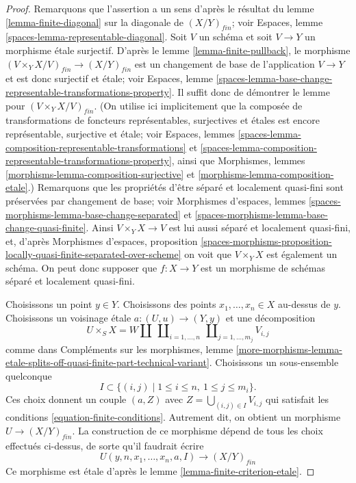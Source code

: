 \begin{proof}
Remarquons que l'assertion a un sens d'après le résultat du
lemme \ref{lemma-finite-diagonal}
sur la diagonale de $(X/Y)_{fin}$; voir
Espaces, lemme \ref{spaces-lemma-representable-diagonal}.
Soit $V$ un schéma et soit $V \to Y$ un morphisme étale surjectif. D'après le
lemme \ref{lemma-finite-pullback},
le morphisme $(V \times_Y X/V)_{fin} \to (X/Y)_{fin}$ est
un changement de base de l'application $V \to Y$ et est donc surjectif et étale; voir
Espaces,
lemme \ref{spaces-lemma-base-change-representable-transformations-property}.
Il suffit donc de démontrer le lemme pour $(V \times_Y X/V)_{fin}$.
(On utilise ici implicitement que la composée de transformations de foncteurs
représentables, surjectives et étales est encore représentable, surjective et
étale; voir
Espaces, lemmes \ref{spaces-lemma-composition-representable-transformations} et
\ref{spaces-lemma-composition-representable-transformations-property}, ainsi que
Morphismes, lemmes \ref{morphisms-lemma-composition-surjective} et
\ref{morphisms-lemma-composition-etale}.)
Remarquons que les propriétés d'être séparé et localement quasi-fini
sont préservées par changement de base; voir
Morphismes d'espaces,
lemmes \ref{spaces-morphisms-lemma-base-change-separated} et
\ref{spaces-morphisms-lemma-base-change-quasi-finite}.
Ainsi $V \times_Y X \to V$ est lui aussi séparé et localement quasi-fini,
et, d'après
Morphismes d'espaces, proposition
\ref{spaces-morphisms-proposition-locally-quasi-finite-separated-over-scheme}
on voit que $V \times_Y X$ est également un schéma.
On peut donc supposer que $f : X \to Y$ est un morphisme de schémas
séparé et localement quasi-fini.

\medskip\noindent
Choisissons un point $y \in Y$. Choisissons des points $x_1, \ldots, x_n \in X$
au-dessus de $y$. Choisissons un voisinage étale $a : (U, u) \to (Y, y)$ et une
décomposition
$$
U \times_S X =
W \amalg
\ \coprod\nolimits_{i = 1, \ldots, n}
\ \coprod\nolimits_{j = 1, \ldots, m_j}
V_{i, j}
$$
comme dans
Compléments sur les morphismes, lemme
\ref{more-morphisms-lemma-etale-splits-off-quasi-finite-part-technical-variant}.
Choisissons un sous-ensemble quelconque
$$
I \subset \{(i, j) \mid 1 \leq i \leq n, \ 1 \leq j \leq m_i\}.
$$
Ces choix donnent un couple $(a, Z)$ avec
$Z = \bigcup_{(i, j) \in I} V_{i, j}$
qui satisfait les conditions \ref{equation-finite-conditions}. Autrement dit,
on obtient un morphisme $U \to (X/Y)_{fin}$. La construction de ce morphisme
dépend de tous les choix effectués ci-dessus, de sorte qu'il faudrait écrire
$$
U(y, n, x_1, \ldots, x_n, a, I) \longrightarrow (X/Y)_{fin}
$$
Ce morphisme est étale d'après le lemme \ref{lemma-finite-criterion-etale}.


\end{proof}
